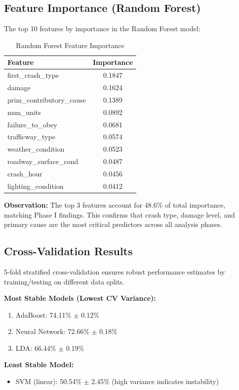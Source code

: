\documentclass[12pt,man]{apa7}
\begin{document}
\subsection{Feature Importance (Random Forest)}

The top 10 features by importance in the Random Forest model:

\begin{table}[H]
\centering
\caption{Random Forest Feature Importance}
\begin{tabular}{lc}
\toprule
\textbf{Feature} & \textbf{Importance} \\
\midrule
first\_crash\_type & 0.1847 \\
damage & 0.1624 \\
prim\_contributory\_cause & 0.1389 \\
num\_units & 0.0892 \\
failure\_to\_obey & 0.0681 \\
trafficway\_type & 0.0574 \\
weather\_condition & 0.0523 \\
roadway\_surface\_cond & 0.0487 \\
crash\_hour & 0.0456 \\
lighting\_condition & 0.0412 \\
\bottomrule
\end{tabular}
\end{table}

\textbf{Observation:} The top 3 features account for 48.6\% of total importance, matching Phase I findings. This confirms that crash type, damage level, and primary cause are the most critical predictors across all analysis phases.

\subsection{Cross-Validation Results}

5-fold stratified cross-validation ensures robust performance estimates by training/testing on different data splits.

\textbf{Most Stable Models (Lowest CV Variance):}
\begin{enumerate}
    \item AdaBoost: 74.11\% $\pm$ 0.12\%
    \item Neural Network: 72.66\% $\pm$ 0.18\%
    \item LDA: 66.44\% $\pm$ 0.19\%
\end{enumerate}

\textbf{Least Stable Model:}
\begin{itemize}
    \item SVM (linear): 50.54\% $\pm$ 2.45\% (high variance indicates instability)
\end{itemize}
\end{document}
